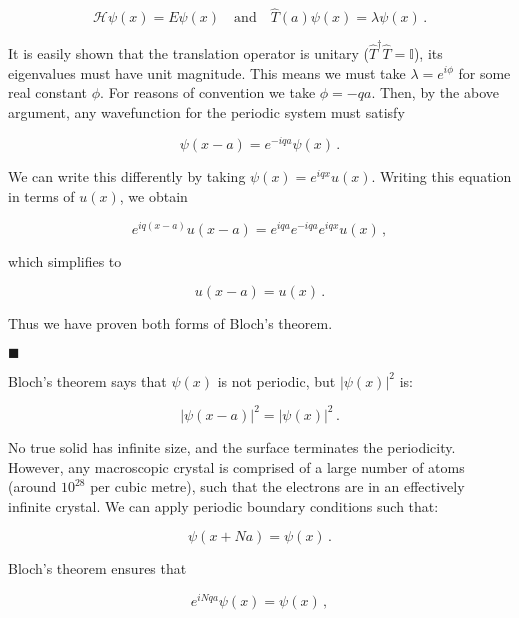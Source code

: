 \documentclass[12pt, titlepage]{article}
\begin{document}
\begin{mdframed}
\begin{equation*}
	\mathcal{H}\psi(x) = E\psi(x) \quad\text{and}\quad \hat{T}(a)\psi(x) = \lambda\psi(x) \,.
\end{equation*}

It is easily shown that the translation operator is unitary ($\hat{T}^\dagger\hat{T}=\mathbb{I}$), its eigenvalues must have unit magnitude. This means we must take $\lambda = e^{i\phi}$ for some real constant $\phi$. For reasons of convention we take $\phi = -qa$. Then, by the above argument, any wavefunction for the periodic system must satisfy

\begin{equation*}
	\psi(x-a)=e^{-iqa}\psi(x) \,.
\end{equation*} 

We can write this differently by taking $\psi(x) = e^{iqx}u(x)$. Writing this equation in terms of $u(x)$, we obtain 

\begin{equation*}
	e^{iq(x-a)}u(x-a) = e^{iqa}e^{-iqa}e^{iqx}u(x) \,,
\end{equation*}

which simplifies to 

\begin{equation*}
	u(x-a) = u(x) \,.
\end{equation*}

Thus we have proven both forms of Bloch's theorem.

\hspace*{\fill}$\blacksquare$
\end{mdframed}

Bloch's theorem says that $\psi(x)$ is not periodic, but $|\psi(x)|^2$ is:

\begin{equation}
	|\psi(x-a)|^2 = |\psi(x)|^2 \,.
\end{equation}

No true solid has infinite size, and the surface terminates the periodicity. However, any macroscopic crystal is comprised of a large number of atoms (around $10^{28}$ per cubic metre), such that the electrons are in an effectively infinite crystal. We can apply periodic boundary conditions such that:

\begin{equation}
	\psi(x+Na) = \psi(x) \,.
\end{equation}

Bloch's theorem ensures that

\begin{equation}
	e^{iNqa}\psi(x) = \psi(x) \,,
\end{equation}
\end{document}
